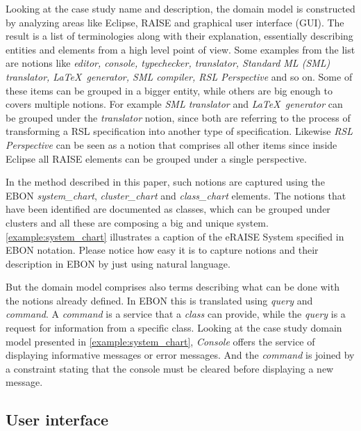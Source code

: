 \documentclass[conference]{IEEEtran}
\newcommand{\note}[1]{\todo[inline,color=red!40]{#1}}
\begin{document}
Looking at the case study name and description, the domain model is
constructed by analyzing areas like Eclipse, RAISE and graphical user
interface (GUI). The result is a list of terminologies along with
their explanation, essentially describing entities and elements from a
high level point of view. Some examples from the list are notions like
\emph{editor, console, typechecker, translator, Standard ML
(SML) translator, \LaTeX\ generator, SML compiler, RSL
Perspective} and so on. Some of these items can be grouped in a bigger
entity, while others are big enough to covers multiple notions. For
example \emph{SML translator} and \emph{\LaTeX\ generator} can be
grouped under the \emph{translator} notion, since both are referring
to the process of transforming a RSL specification into another type
of specification. Likewise \emph{RSL Perspective} can be seen as a
notion that comprises all other items since inside Eclipse all RAISE
elements can be grouped under a single perspective.




In the method described in this paper, such notions are captured using
the EBON \emph{system\_chart}, \emph{cluster\_chart} and
\emph{class\_chart} elements. The notions that have been identified
are documented as classes, which can be grouped under clusters and all
these are composing a big and unique system.
\autoref{example:system_chart} illustrates a caption of the eRAISE
System specified in EBON notation. Please notice how easy it is to
capture notions and their description in EBON by just using natural
language.

But the domain model comprises also terms describing what can be
done with the notions already defined. In EBON this is
translated using \emph{query} and \emph{command}. A
\emph{command} is a service that a \emph{class} can provide,
while the \emph{query} is a request for information from a
specific class. Looking at the case study domain model presented
in \autoref{example:system_chart}, \emph{Console} offers the
service of displaying informative messages or error messages.
And the \emph{command} is joined by a constraint stating that
the console must be cleared before displaying a new message.

%
\subsection{User interface}
\label{sec:user-interface}
\end{document}
